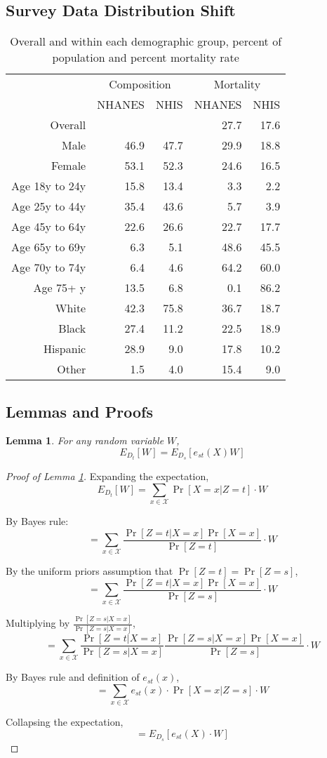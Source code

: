 \documentclass{article} %
\newtheorem{lemma}{Lemma}
\begin{document}
\subsection{Survey Data Distribution Shift}
\begin{table}[H]
    \centering
\begin{tabular}{rrrrr}
& \multicolumn{2}{c}{Composition} & \multicolumn{2}{c}{Mortality}\\
  & NHANES & NHIS &NHANES & NHIS\\
\hline
Overall & &  & 27.7 & 17.6\\
\hline
Male & 46.9 & 47.7 & 29.9 & 18.8\\
Female & 53.1 & 52.3 & 24.6 & 16.5\\
Age 18y to 24y & 15.8 & 13.4 & 3.3 & 2.2\\
Age 25y to 44y & 35.4 & 43.6 & 5.7 & 3.9\\
Age 45y to 64y & 22.6 & 26.6 & 22.7 & 17.7\\
Age 65y to 69y & 6.3 & 5.1 & 48.6 & 45.5\\
Age 70y to 74y & 6.4 & 4.6 & 64.2 & 60.0\\
Age 75+ y & 13.5 & 6.8 & 0.1 & 86.2\\
White & 42.3 & 75.8 & 36.7 & 18.7\\
Black & 27.4 & 11.2 & 22.5 & 18.9\\
Hispanic & 28.9 & 9.0 & 17.8 & 10.2\\
Other & 1.5 & 4.0 & 15.4 & 9.0\\
\hline
\end{tabular}
\caption{Overall and within each demographic group, percent of population and percent mortality rate}
\label{tab:distribution_shift}
\end{table}


\subsection{Lemmas and Proofs}
\begin{lemma}
\label{lemma1}
For any random variable $W$, 
\begin{equation*}
   E_{D_t}[W]  = E_{D_s}[e_{st}(X)W]
\end{equation*}
\end{lemma}
\begin{proof}[Proof of Lemma \ref{lemma1}]
Expanding the expectation,
$$E_{D_t}[W] = \sum_{x \in \mathcal{X}}\Pr[X=x|Z=t]\cdot W$$

By Bayes rule:
$$= \sum_{x \in \mathcal{X}}\frac{\Pr[Z=t|X=x]\Pr[X=x]}{\Pr[Z=t]}\cdot W$$

By the uniform priors assumption that $\Pr[Z=t] = \Pr[Z=s]$,
$$= \sum_{x \in \mathcal{X}}\frac{\Pr[Z=t|X=x]\Pr[X=x]}{\Pr[Z=s]}\cdot W$$

Multiplying by $\frac{\Pr[Z=s|X=x]}{\Pr[Z=s|X=x]}$,
$$= \sum_{x \in \mathcal{X}}\frac{\Pr[Z=t|X=x]}{\Pr[Z=s|X=x]}\frac{\Pr[Z=s|X=x]\Pr[X=x]}{\Pr[Z=s]}\cdot W$$

By Bayes rule and definition of $e_{st}(x)$,
$$= \sum_{x \in \mathcal{X}}e_{st}(x)\cdot \Pr[X=x|Z=s]\cdot W$$

Collapsing the expectation,
$$= E_{D_s}[e_{st}(X)\cdot W]$$
\end{proof}
\end{document}
